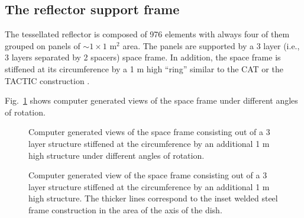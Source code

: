 
\subsection{The reflector support frame}


\medskip The tessellated reflector is composed of 976 elements with always four
of them grouped on panels of $\sim 1 \times 1$ m$^2$ area. The panels are
supported by a 3 layer (i.e., 3 layers separated by 2 spacers) space frame.
In addition, the space frame is stiffened at its circumference by a 1 m high
``ring'' similar to the CAT \cite{cat:93} or the TACTIC construction \cite{TACTIC}.

Fig.~\ref{fig-mero_gitter1} shows computer generated views of the space
frame under different angles of rotation. 

\begin{figure}[htb]
\leavevmode
\centering
\epsfxsize=14cm
\caption{Computer generated views of the
space frame consisting out of a 3 layer structure stiffened at the
circumference by an additional 1 m high structure under different angles of rotation.}
\label{fig-mero_gitter1}
\end{figure}


\begin{figure}[htb]
\leavevmode
\centering
\epsfxsize=14cm
\caption{Computer generated view of the
space frame consisting out of a 3 layer structure stiffened at the
circumference by an additional 1 m high structure. The thicker lines correspond to
the inset welded steel frame construction in the area of the axis of the dish.}
\label{fig-mero_gitter2}
\end{figure}


